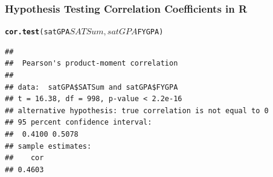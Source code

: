 \documentclass{beamer}\usepackage{graphicx, color}
\makeatletter
\newcommand{\hlfunctioncall}[1]{\textcolor[rgb]{0.501960784313725,0,0.329411764705882}{\textbf{#1}}}%
\newenvironment{kframe}{%
 \def\at@end@of@kframe{}%
 \ifinner\ifhmode%
  \def\at@end@of@kframe{\end{minipage}}%
  \begin{minipage}{\columnwidth}%
 \fi\fi%
 \def\FrameCommand##1{\hskip\@totalleftmargin \hskip-\fboxsep
 \colorbox{shadecolor}{##1}\hskip-\fboxsep
     \hskip-\linewidth \hskip-\@totalleftmargin \hskip\columnwidth}%
 \MakeFramed {\advance\hsize-\width
   \@totalleftmargin\z@ \linewidth\hsize
   \@setminipage}}%
 {\par\unskip\endMakeFramed%
 \at@end@of@kframe}
\newenvironment{knitrout}{}{} %
\makeatother
\begin{document}
\begin{frame}[fragile]
  \frametitle{Hypothesis Testing Correlation Coefficients in R}
\begin{knitrout}
\color{fgcolor}\begin{kframe}
\begin{alltt}
\hlfunctioncall{cor.test}(satGPA$SATSum, satGPA$FYGPA)
\end{alltt}
\begin{verbatim}
## 
## 	Pearson's product-moment correlation
## 
## data:  satGPA$SATSum and satGPA$FYGPA 
## t = 16.38, df = 998, p-value < 2.2e-16
## alternative hypothesis: true correlation is not equal to 0 
## 95 percent confidence interval:
##  0.4100 0.5078 
## sample estimates:
##    cor 
## 0.4603
\end{verbatim}
\end{kframe}
\end{knitrout}

\end{frame}


\end{document}
